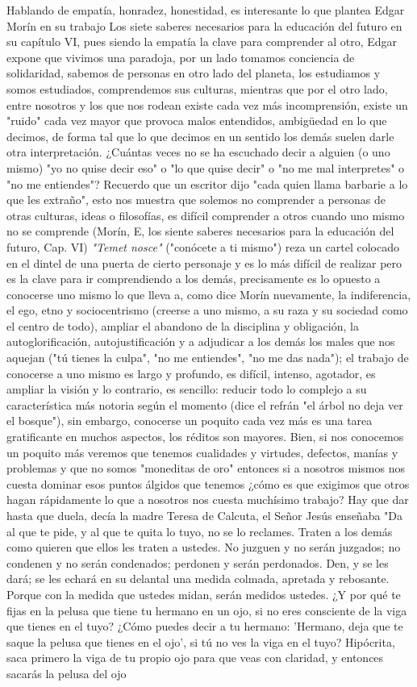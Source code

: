\documentclass[12pt]{book} %
\begin{document}
Hablando de empatía, honradez, honestidad, es interesante lo que plantea Edgar Morín en su trabajo Los siete saberes necesarios para la educación del futuro en su capítulo VI, pues siendo la empatía la clave para comprender al otro, Edgar expone que vivimos una paradoja, por un lado tomamos conciencia de solidaridad, sabemos de personas en otro lado del planeta, los estudiamos y somos estudiados, comprendemos sus culturas, mientras que por el otro lado, entre nosotros y los que nos rodean existe cada vez más incomprensión, existe un "ruido" cada vez mayor que provoca malos entendidos, ambigüedad en lo que decimos, de forma tal que lo que decimos en un sentido los demás suelen darle otra interpretación. ¿Cuántas veces no se ha escuchado decir a alguien (o uno mismo) "yo no quise decir eso" o "lo que quise decir" o "no me mal interpretes" o "no me entiendes"? Recuerdo que un escritor dijo "cada quien llama barbarie a lo que les extraño", esto nos muestra que solemos no comprender a personas de otras culturas, ideas o filosofías, es difícil comprender a otros cuando uno mismo no se comprende (Morín, E, los siente saberes necesarios para la educación del futuro, Cap. VI) \emph{"Temet nosce"} ("conócete a ti mismo") reza un cartel colocado en el dintel de una puerta de cierto personaje y es lo más difícil de realizar pero es la clave para ir comprendiendo a los demás, precisamente es lo opuesto a conocerse uno mismo lo que lleva a, como dice Morín nuevamente, la indiferencia, el ego, etno y sociocentrismo (creerse a uno mismo, a su raza y su sociedad como el centro de todo), ampliar el abandono de la disciplina y obligación, la autoglorificación, autojustificación y a adjudicar a los demás los males que nos aquejan ("tú tienes la culpa", "no me entiendes", "no me das nada"); el trabajo de conocerse a uno mismo es largo y profundo, es difícil, intenso, agotador, es ampliar la visión y lo contrario, es sencillo: reducir todo lo complejo a su característica más notoria según el momento (dice el refrán "el árbol no deja ver el bosque"), sin embargo, conocerse un poquito cada vez más es una tarea gratificante en muchos aspectos, los réditos son mayores. Bien, si nos conocemos un poquito más veremos que tenemos cualidades y virtudes, defectos, manías y problemas y que no somos "moneditas de oro" entonces si a nosotros mismos nos cuesta dominar esos puntos álgidos que tenemos ¿cómo es que exigimos que otros hagan rápidamente lo que a nosotros nos cuesta muchísimo trabajo? Hay que dar hasta que duela, decía la madre Teresa de Calcuta, el Señor Jesús enseñaba "Da al que te pide, y al que te quita lo tuyo, no se lo reclames. Traten a los demás como quieren que ellos les traten a ustedes. No juzguen y no serán juzgados; no condenen y no serán condenados; perdonen y serán perdonados. Den, y se les dará; se les echará en su delantal una medida colmada, apretada y rebosante. Porque con la medida que ustedes midan, serán medidos ustedes. ¿Y por qué te fijas en la pelusa que tiene tu hermano en un ojo, si no eres consciente de la viga que tienes en el tuyo? ¿Cómo puedes decir a tu hermano: 'Hermano, deja que te saque la pelusa que tienes en el ojo', si tú no ves la viga en el tuyo? Hipócrita, saca primero la viga de tu propio ojo para que veas con claridad, y entonces sacarás la pelusa del ojo 
\end{document}
